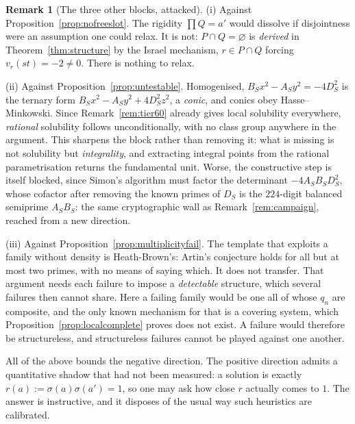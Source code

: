 \documentclass[11pt]{article}
\theoremstyle{definition}
\newtheorem{remark}[theorem]{Remark}
\begin{document}
\begin{remark}[The three other blocks, attacked]\label{rem:blockattacks}
\textup{(i) Against Proposition~\ref{prop:nofreeslot}.} The rigidity $\prod Q=a'$ would dissolve if
disjointness were an assumption one could relax. It is not: $P\cap Q=\varnothing$ is
\emph{derived} in Theorem~\ref{thm:structure} by the Israel mechanism, $r\in P\cap Q$ forcing
$v_r(st)=-2\neq0$. There is nothing to relax.

\textup{(ii) Against Proposition~\ref{prop:untestable}.} Homogenised, $B_Sx^2-A_Sy^2=-4D_S^2$ is the
ternary form $B_Sx^2-A_Sy^2+4D_S^2z^2$, a \emph{conic}, and conics obey Hasse--Minkowski. Since
Remark~\ref{rem:tier60} already gives local solubility everywhere, \emph{rational} solubility
follows unconditionally, with no class group anywhere in the argument. This sharpens the block
rather than removing it: what is missing is not solubility but \emph{integrality}, and extracting
integral points from the rational parametrisation returns the fundamental unit. Worse, the
constructive step is itself blocked, since Simon's algorithm must factor the determinant
$-4A_SB_SD_S^2$, whose cofactor after removing the known primes of $D_S$ is the $224$-digit balanced
semiprime $A_SB_S$: the same cryptographic wall as Remark~\ref{rem:campaign}, reached from a new
direction.

\textup{(iii) Against Proposition~\ref{prop:multiplicityfail}.} The template that exploits a family
without density is Heath-Brown's: Artin's conjecture holds for all but at most two primes, with no
means of saying which. It does not transfer. That argument needs each failure to impose a
\emph{detectable} structure, which several failures then cannot share. Here a failing family would
be one all of whose $q_n$ are composite, and the only known mechanism for that is a covering system,
which Proposition~\ref{prop:localcomplete} proves does not exist. A failure would therefore be
structureless, and structureless failures cannot be played against one another.
\end{remark}

All of the above bounds the negative direction. The positive direction admits a quantitative
shadow that had not been measured: a solution is exactly $r(a):=\sigma(a)\sigma(a')=1$, so one may
ask how close $r$ actually comes to $1$. The answer is instructive, and it disposes of the usual
way such heuristics are calibrated.
\end{document}
